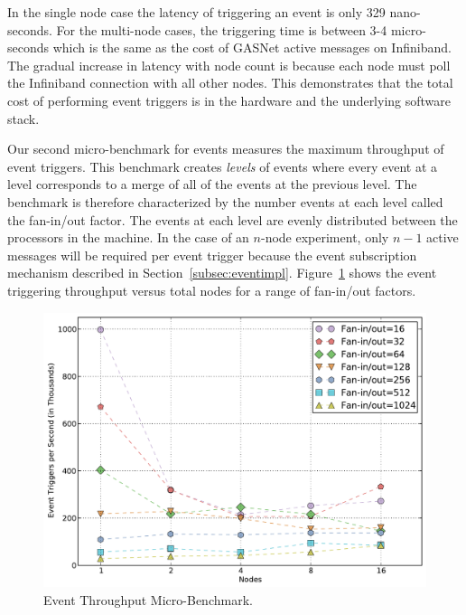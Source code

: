 In the single node case the latency of triggering an event is only 
329 nano-seconds.  For the multi-node cases, the triggering time is
between 3-4 micro-seconds which is the same as the cost of GASNet
active messages on Infiniband\cite{GASNET07}.  The gradual increase in latency with
node count is because each node must poll the Infiniband connection with all other nodes.
This demonstrates that the total cost of performing event triggers is in
the hardware and the underlying software stack.

Our second micro-benchmark for events measures the maximum throughput of event
triggers.  This benchmark creates {\em levels} of events where every event at a level
corresponds to a merge of all of the events at the previous level.  The benchmark is therefore
characterized by the number events at each level called the fan-in/out factor.  
The events at each level are evenly distributed between the processors in the machine.
In the case of an $n$-node experiment, only $n-1$ active messages will be required 
per event trigger because the event subscription mechanism described in 
Section~\ref{subsec:eventimpl}.  Figure~\ref{fig:eventthroo} shows the event triggering
throughput versus total nodes for a range of fan-in/out factors.

\begin{figure}
\begin{center}
\includegraphics[scale=0.33]{figs/event_throughput.pdf}
\end{center}
\vspace{-6mm}
\caption{Event Throughput Micro-Benchmark.\label{fig:eventthroo}}
\vspace{-4mm}
\end{figure}

